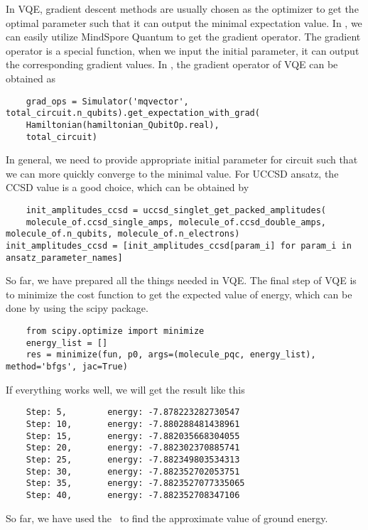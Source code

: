 In VQE, gradient descent methods are usually chosen as the optimizer to get the optimal parameter such that it can output the minimal expectation value. 
In \MindQuantum, we can easily utilize MindSpore Quantum to get the gradient operator.
The gradient operator is a special function, when we input the initial parameter, it can output the corresponding gradient values.
In \MindQuantum, the gradient operator of VQE can be obtained as
\begin{lstlisting}
    grad_ops = Simulator('mqvector', total_circuit.n_qubits).get_expectation_with_grad(
    Hamiltonian(hamiltonian_QubitOp.real),
    total_circuit)
\end{lstlisting}
In general, we need to provide appropriate initial parameter for circuit such that we can more quickly converge to the minimal value. For UCCSD ansatz, the CCSD value is a good choice, which can be obtained by
\begin{lstlisting}
    init_amplitudes_ccsd = uccsd_singlet_get_packed_amplitudes(
    molecule_of.ccsd_single_amps, molecule_of.ccsd_double_amps, molecule_of.n_qubits, molecule_of.n_electrons)
init_amplitudes_ccsd = [init_amplitudes_ccsd[param_i] for param_i in ansatz_parameter_names]
\end{lstlisting}
So far, we have prepared all the things needed in VQE.
The final step of VQE is to minimize the cost function to get the expected value of energy, which can be done by using the scipy package.
\begin{lstlisting}
    from scipy.optimize import minimize
    energy_list = []
    res = minimize(fun, p0, args=(molecule_pqc, energy_list), method='bfgs', jac=True)
\end{lstlisting}
If everything works well, we will get the result like this
\begin{lstlisting}
    Step: 5,        energy: -7.878223282730547
    Step: 10,       energy: -7.880288481438961
    Step: 15,       energy: -7.882035668304055
    Step: 20,       energy: -7.882302370885741
    Step: 25,       energy: -7.882349803534313
    Step: 30,       energy: -7.882352702053751
    Step: 35,       energy: -7.8823527077335065
    Step: 40,       energy: -7.882352708347106
\end{lstlisting}
So far, we have used the \MindQuantum\ to find the approximate value of ground energy. 